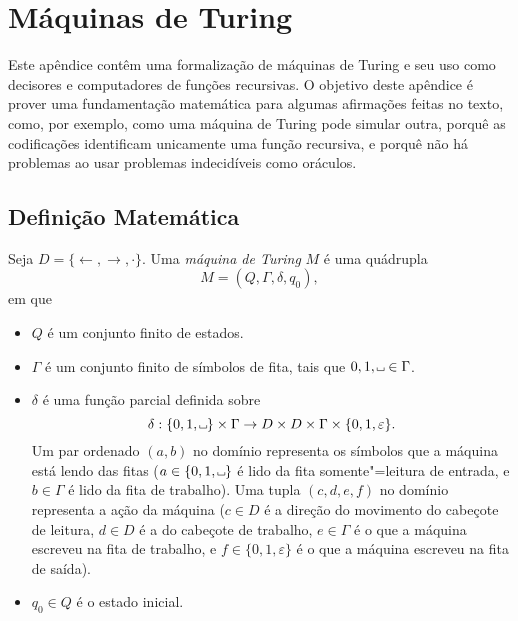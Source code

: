 \chapter{Máquinas de Turing}
\label{app:turing_machines}

\newcommand\B{\tikz{\draw (0, 0.5ex) -- (0, 0) -- (0.5em, 0) -- (0.5em, 0.5ex);}}

Este apêndice contêm uma formalização de máquinas de Turing
e seu uso como decisores e computadores de funções recursivas.
O objetivo deste apêndice é prover uma fundamentação matemática
para algumas afirmações feitas no texto,
como, por exemplo,
como uma máquina de Turing pode simular outra,
porquê as codificações identificam unicamente uma função recursiva,
e porquê não há problemas ao usar problemas indecidíveis como oráculos.

\section{Definição Matemática}

\begin{definition}
    Seja $D = \{\leftarrow, \rightarrow, \cdot\}$.
    Uma \emph{máquina de Turing} $M$ é uma quádrupla
    \begin{equation*}
        M = (Q, \Gamma, \delta, q_0),
    \end{equation*}
    em que
    \begin{itemize}
        \setlength{\labelsep}{1ex}
        \item $Q$ é um conjunto finito de estados.
        \item $\Gamma$ é um conjunto finito de símbolos de fita,
            tais que $0, 1, \B \in \Gamma$.
        \item $\delta$ é uma função parcial definida sobre
            \begin{equation*}
                \delta: \{0, 1, \B\} \times \Gamma
                    \to D \times D \times \Gamma \times \{0, 1, \varepsilon\}.
            \end{equation*}
            Um par ordenado $(a, b)$ no domínio
            representa os símbolos que a máquina está lendo das fitas
            ($a \in \{0, 1, \B\}$ é lido da fita somente"=leitura de entrada,
            e $b \in \Gamma$ é lido da fita de trabalho).
            Uma tupla $(c, d, e, f)$ no domínio
            representa a ação da máquina
            ($c \in D$ é a direção do movimento do cabeçote de leitura,
            $d \in D$ é a do cabeçote de trabalho,
            $e \in \Gamma$ é o que a máquina escreveu na fita de trabalho,
            e $f \in \{0, 1, \varepsilon\}$ é o que a máquina escreveu
            na fita de saída).
        \item $q_0 \in Q$ é o estado inicial.
    \end{itemize}
\end{definition}

